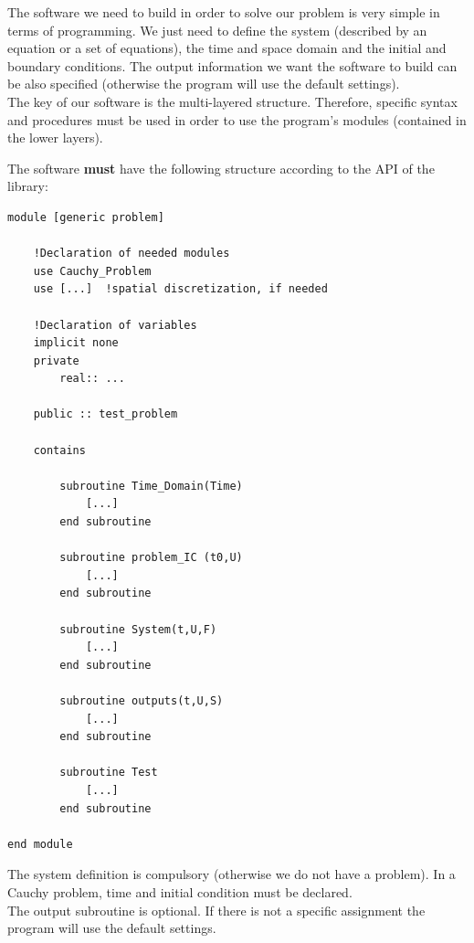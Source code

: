 The software we need to build in order to solve our problem is very simple in
terms of programming. We just need to define the system (described by an
equation or a set of equations), the time and space domain and the initial and
boundary conditions. The output information we want the software to build
can be also specified (otherwise the program will use the default settings). \\

The key of our software is the multi-layered structure. Therefore, specific
syntax and procedures must be used in order to use the program's modules
(contained in the lower layers).
\\

\vspace{1cm}

The software {\bf must} have the following structure according to the API of
the library:\\

\begin{blueframed}

\begin{lstlisting}
module [generic problem]

	!Declaration of needed modules
	use Cauchy_Problem
	use [...]  !spatial discretization, if needed
	
	!Declaration of variables
	implicit none
	private
		real:: ...
	
	public :: test_problem
	
	contains
	
		subroutine Time_Domain(Time)
			[...]
		end subroutine
		
		subroutine problem_IC (t0,U)
			[...]
		end subroutine
		
		subroutine System(t,U,F)
			[...]
		end subroutine
		
		subroutine outputs(t,U,S)
			[...]
		end subroutine
		
		subroutine Test
			[...]
		end subroutine

end module
\end{lstlisting}
\end{blueframed}

The system definition is compulsory (otherwise we do not have a problem). In a
Cauchy problem, time and initial condition must be declared. \\

The output subroutine is optional. If there is not a specific assignment the
program will use the default settings.
\\

